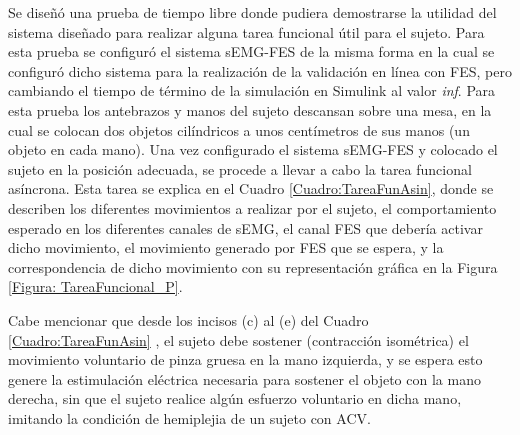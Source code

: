 Se diseñó una prueba de tiempo libre donde pudiera demostrarse la utilidad del sistema diseñado para realizar alguna tarea funcional útil para el sujeto. Para esta prueba se configuró el sistema sEMG-FES de la misma forma en la cual se configuró dicho sistema para la realización de la validación en línea con FES, pero cambiando el tiempo de término de la simulación en Simulink \textregistered\; al valor \emph{inf}. Para esta prueba los antebrazos y manos del sujeto descansan sobre una mesa, en la cual se colocan dos objetos cilíndricos a unos centímetros de sus manos (un objeto en cada mano). Una vez configurado el sistema sEMG-FES y colocado el sujeto en la posición adecuada, se procede a llevar a cabo la tarea funcional asíncrona. Esta tarea se explica en el Cuadro \ref{Cuadro:TareaFunAsin}, donde se describen los diferentes movimientos a realizar por el sujeto, el comportamiento esperado en los diferentes canales de sEMG, el canal FES que debería activar dicho movimiento, el movimiento generado por FES que se espera, y la correspondencia de dicho movimiento con su representación gráfica en la Figura \ref{Figura: TareaFuncional_P}.

Cabe mencionar que desde los incisos (c) al (e) del Cuadro \ref{Cuadro:TareaFunAsin} , el sujeto debe sostener (contracción isométrica) el movimiento voluntario de pinza gruesa en la mano izquierda, y se espera esto genere la estimulación eléctrica necesaria para sostener el objeto con la mano derecha, sin que el sujeto realice algún esfuerzo voluntario en dicha mano, imitando la condición de hemiplejia de un sujeto con ACV.

